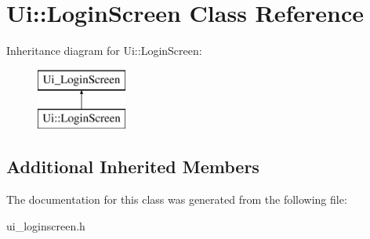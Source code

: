\hypertarget{class_ui_1_1_login_screen}{}\section{Ui\+:\+:Login\+Screen Class Reference}
\label{class_ui_1_1_login_screen}
Inheritance diagram for Ui\+:\+:Login\+Screen\+:\begin{figure}[H]
\begin{center}
\leavevmode
\includegraphics[height=2.000000cm]{class_ui_1_1_login_screen}
\end{center}
\end{figure}
\subsection*{Additional Inherited Members}


The documentation for this class was generated from the following file\+:\begin{DoxyCompactItemize}
\item 
ui\+\_\+loginscreen.\+h\end{DoxyCompactItemize}
